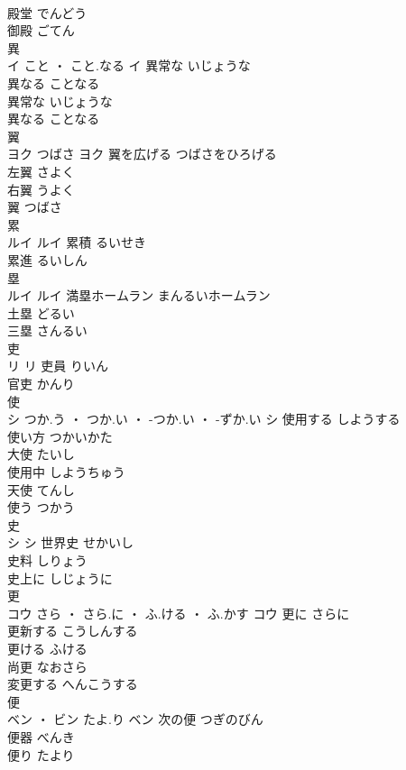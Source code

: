 \documentclass[8pt]{extreport}
\begin{document}
\begin{CJK}{UTF8}{min}
\\	殿堂	でんどう	
\\	御殿	ごてん	
\\	異	
\\	イ	こと ・ こと.なる	イ	異常な	いじょうな	
\\	異なる	ことなる	
\\	異常な	いじょうな	
\\	異なる	ことなる	
\\	翼	
\\	ヨク	つばさ	ヨク	翼を広げる	つばさをひろげる	
\\	左翼	さよく	
\\	右翼	うよく	
\\	翼	つばさ	
\\	累	
\\	ルイ		ルイ	累積	るいせき	
\\	累進	るいしん	
\\	塁	
\\	ルイ		ルイ	満塁ホームラン	まんるいホームラン	
\\	土塁	どるい	
\\	三塁	さんるい	
\\	吏	
\\	リ		リ	吏員	りいん	
\\	官吏	かんり	
\\	使	
\\	シ	つか.う ・ つか.い ・ -つか.い ・ -ずか.い	シ	使用する	しようする	
\\	使い方	つかいかた	
\\	大使	たいし	
\\	使用中	しようちゅう	
\\	天使	てんし	
\\	使う	つかう	
\\	史	
\\	シ		シ	世界史	せかいし	
\\	史料	しりょう	
\\	史上に	しじょうに	
\\	更	
\\	コウ	さら ・ さら.に ・ ふ.ける ・ ふ.かす	コウ	更に	さらに	
\\	更新する	こうしんする	
\\	更ける	ふける	
\\	尚更	なおさら	
\\	変更する	へんこうする	
\\	便	
\\	ベン ・ ビン	たよ.り	ベン	次の便	つぎのびん	
\\	便器	べんき	
\\	便り	たより	

\end{CJK}
\end{document}
